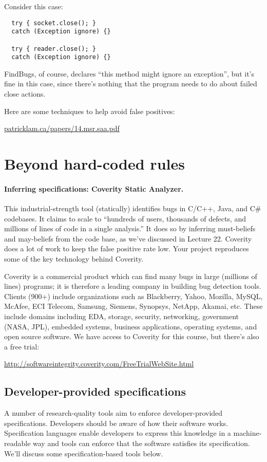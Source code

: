 \documentclass[11pt]{article}
\begin{document}
Consider this case:
\begin{lstlisting}
  try { socket.close(); }
  catch (Exception ignore) {}

  try { reader.close(); }
  catch (Exception ignore) {}
\end{lstlisting}
FindBugs, of course, declares ``this method might ignore an exception'', but it's fine in
this case, since there's nothing that the program needs to do about failed close actions.

\newpage
Here are some techniques to help avoid false positives:
\begin{center}
  \url{patricklam.ca/papers/14.msr.saa.pdf}
\end{center}

\section*{Beyond hard-coded rules}

\paragraph{Inferring specifications: Coverity Static Analyzer.} 
This industrial-strength tool (statically) identifies bugs in C/C++,
Java, and C\# codebases. It claims to scale to ``hundreds of users,
thousands of defects, and millions of lines of code in a single
analysis.'' It does so by inferring must-beliefs and may-beliefs from
the code base, as we've discussed in Lecture 22. Coverity does a lot
of work to keep the false positive rate low. Your project reproduces some 
of the key technology behind Coverity.

Coverity is a commercial product which can find many bugs in large
(millions of lines) programs; it is therefore a leading company in
building bug detection tools. Clients (900+) include organizations
such as Blackberry, Yahoo, Mozilla, MySQL, McAfee, ECI Telecom,
Samsung, Siemens, Synopsys, NetApp, Akamai, etc. These include domains
including EDA, storage, security, networking, government (NASA, JPL),
embedded systems, business applications, operating systems, and open
source software.  We have access to Coverity for this course, but
there's also a free trial:
\begin{center}
  \url{http://softwareintegrity.coverity.com/FreeTrialWebSite.html}
\end{center}


\subsection*{Developer-provided specifications}
A number of research-quality tools aim to enforce developer-provided specifications.
Developers should be aware of how their software works. Specification languages
enable developers to express this knowledge in a machine-readable way and tools
can enforce that the software satisfies its specification. We'll discuss some 
specification-based tools below.
\end{document}
